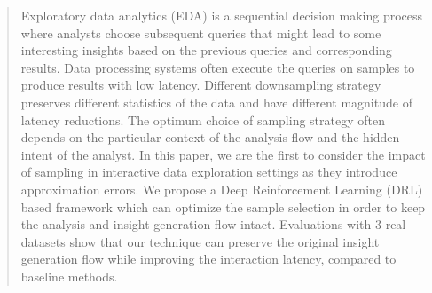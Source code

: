 \begin{abstract}

Exploratory data analytics (EDA) is a sequential decision making process where analysts choose subsequent queries that might lead to some interesting insights based on the previous queries and corresponding results.
Data processing systems often execute the queries on samples to produce results with low latency. 
Different downsampling strategy preserves different statistics of the data and have different magnitude of latency reductions. The optimum choice of sampling strategy often depends on the particular context of the analysis flow and the hidden intent of the analyst. 
%
In this paper, we are the first to consider the impact of sampling in interactive data exploration settings as they introduce approximation errors. We propose a Deep Reinforcement Learning (DRL) based framework which can optimize the sample selection in order to keep the analysis and insight generation flow intact. 
Evaluations with 3 real datasets show that our technique can preserve the original insight generation flow while improving the interaction latency, compared to baseline methods.

\end{abstract}